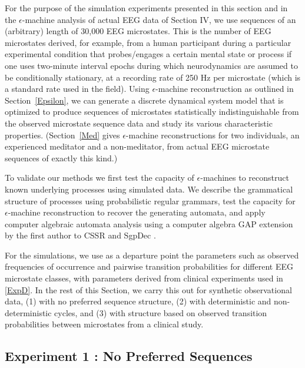 \documentclass[journal]{IEEEtran}
\begin{document}
For the purpose of the simulation experiments presented in this section 
and in the $\epsilon$-machine analysis of actual EEG data of Section IV, we use sequences of an (arbitrary) length of 30,000 EEG microstates. This is the number of EEG microstates derived, for example, from a human participant during  a particular experimental condition that probes/engages a certain  mental state or process if one uses two-minute interval  epochs during which neurodynamics are assumed to be conditionally stationary, at a recording rate of 250 Hz per microstate (which is a standard rate used in the field).
Using 
$\epsilon$-machine reconstruction as outlined in Section~\ref{Epsilon}, we can generate a discrete dynamical system model that is optimized to produce sequences of microstates statistically indistinguishable from the observed microstate sequence data and study its various characteristic properties. 
 (Section~\ref{Med} gives $\epsilon$-machine
reconstructions for two individuals, an experienced meditator and a non-meditator, from actual EEG microstate sequences of exactly this kind.) 


To validate our methods we  first test the capacity of $\epsilon$-machines to reconstruct known underlying processes using simulated data.
 We describe
the grammatical structure of processes using probabilistic regular grammars,  test the capacity for $\epsilon$-machine reconstruction to
recover the generating automata, and apply computer algebraic automata analysis using a computer algebra GAP extension by the first author
 to CSSR \cite{Shalizi2004} and SgpDec \cite{AttilaJamesChrystopher}. 



For the simulations, we use as a departure point the parameters such as observed frequencies of occurrence and pairwise transition probabilities for different EEG microstate classes,  with parameters derived from clinical experiments used in \ref{ExpD}.
In the rest of this Section, we carry this out for synthetic observational data, (1) with no preferred sequence structure, (2) with deterministic and non-deterministic cycles, and (3) with structure based on observed transition probabilities between microstates from a clinical study.  


\subsection{Experiment 1 : No Preferred Sequences}
\end{document}
